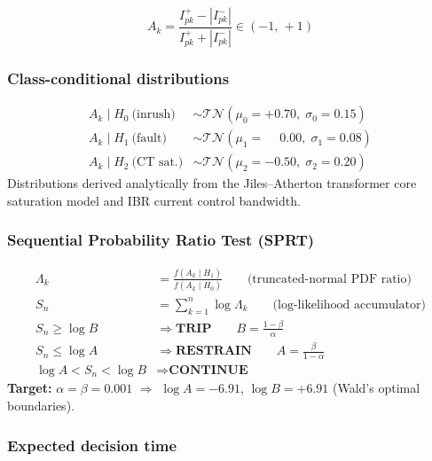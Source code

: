 \documentclass[12pt, a4paper]{report}
\begin{document}
\begin{equation}
  A_k = \frac{I_{pk}^+ - |I_{pk}^-|}{I_{pk}^+ + |I_{pk}^-|} \in (-1,\, +1)
\end{equation}

\subsubsection{Class-conditional distributions}

\begin{tcolorbox}[mathbox]
\begin{align}
  A_k \mid H_0\ \text{(inrush)}  &\sim \mathcal{TN}(\mu_0 = +0.70,\; \sigma_0 = 0.15) \\
  A_k \mid H_1\ \text{(fault)}   &\sim \mathcal{TN}(\mu_1 = \phantom{+}0.00,\; \sigma_1 = 0.08) \\
  A_k \mid H_2\ \text{(CT sat.)} &\sim \mathcal{TN}(\mu_2 = -0.50,\; \sigma_2 = 0.20)
\end{align}
Distributions derived analytically from the Jiles--Atherton transformer core saturation model and IBR current control bandwidth.
\end{tcolorbox}

\subsubsection{Sequential Probability Ratio Test (SPRT)}

\begin{tcolorbox}[mathbox]
\begin{align}
  \Lambda_k &= \frac{f(A_k \mid H_1)}{f(A_k \mid H_0)} \qquad\text{(truncated-normal PDF ratio)} \\[6pt]
  S_n &= \sum_{k=1}^{n} \log \Lambda_k \qquad\text{(log-likelihood accumulator)} \\[8pt]
  S_n \ge \log B &\Rightarrow \textbf{TRIP} \qquad B = \frac{1-\beta}{\alpha} \\
  S_n \le \log A &\Rightarrow \textbf{RESTRAIN} \qquad A = \frac{\beta}{1-\alpha} \\
  \log A < S_n < \log B &\Rightarrow \textbf{CONTINUE}
\end{align}
\textbf{Target:} $\alpha = \beta = 0.001$ $\Rightarrow$ $\log A = -6.91$, $\log B = +6.91$ (Wald's optimal boundaries).
\end{tcolorbox}

\subsubsection{Expected decision time}
\end{document}
